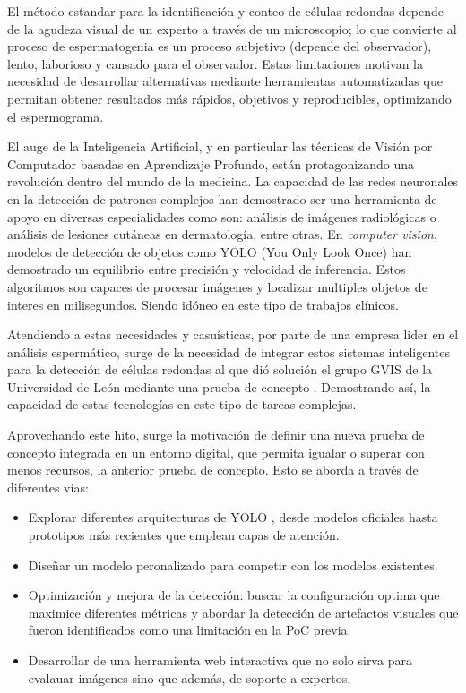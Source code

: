 \documentclass[12pt,a4paper,onecolumn,oneside]{report}
\begin{document}
El método estandar para la identificación y conteo de células redondas depende de la agudeza visual de un experto a través de un microscopio; lo que convierte al proceso de
espermatogenia es un proceso subjetivo (depende del observador), lento, laborioso y cansado para el observador. Estas limitaciones motivan la necesidad 
de desarrollar alternativas mediante herramientas automatizadas que permitan obtener resultados más rápidos, objetivos y reproducibles, optimizando el espermograma.

El auge de la Inteligencia Artificial, y en particular las técnicas de Visión por Computador basadas en Aprendizaje Profundo, están protagonizando una revolución dentro del mundo de la medicina.
La capacidad de las redes neuronales en la detección de patrones complejos han demostrado ser una herramienta de apoyo en diversas especialidades como son: análisis de imágenes radiológicas o análisis de lesiones cutáneas en dermatología, entre otras.
En \textit{computer vision}, modelos de detección de objetos como YOLO (You Only Look Once) \cite{ultralytics_models} han demostrado un equilibrio entre precisión y velocidad de inferencia. Estos algoritmos son capaces de procesar imágenes y localizar multiples objetos de interes en milisegundos.
Siendo idóneo en este tipo de trabajos clínicos.

Atendiendo a estas necesidades y casuísticas, por parte de una empresa lider en el análisis espermático, surge de la necesidad de integrar estos sistemas inteligentes para la detección de células redondas al que dió solución el grupo GVIS de la 
Universidad de León mediante una prueba de concepto \cite{HamiltonThorneRoundCells}. Demostrando así, la capacidad de estas tecnologías en este tipo de tareas complejas.

Aprovechando este hito, surge la motivación de definir una nueva prueba de concepto integrada en un entorno digital, que permita igualar o superar con menos recursos, la anterior prueba de concepto. Esto se aborda a través de diferentes vías:

\begin{itemize}
  \item Explorar diferentes arquitecturas de YOLO \cite{ultralytics_models}, desde modelos oficiales hasta prototipos más recientes que emplean capas de atención. 
  \item Diseñar un modelo peronalizado para competir con los modelos existentes.
  \item Optimización y mejora de la detección: buscar la configuración optima que maximice diferentes métricas y abordar la detección de artefactos visuales que fueron identificados como una limitación en la PoC previa. 
  \item Desarrollar de una herramienta web interactiva que no solo sirva para evalauar imágenes sino que además, de soporte a expertos.
\end{itemize}
\end{document}
